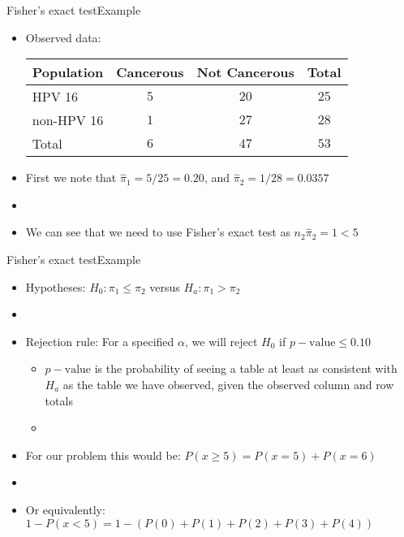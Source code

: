 \documentclass[xcolor=dvipsnames]{beamer}
\begin{document}
\begin{frame}{Fisher's exact test}{Example}
	\begin{itemize}
		\item Observed data:
		\begin{center}
			\begin{tabular}{l|cc|c}
				\hline
				\textbf{Population} & \textbf{Cancerous} & \textbf{Not Cancerous} & \textbf{Total} \\ \hline \hline
				HPV 16 & $5$ &$20$ & $25$\\
				non-HPV 16 & $1$ &$27$ & $28$ \\
				Total & $6$ & $47$ & $53$ \\ \hline
			\end{tabular}
		\end{center} \pause
	\vspace{5mm}
	\item First we note that $\hat{\pi}_1 = 5/25 = 0.20$, and $\hat{\pi}_2 = 1/28 = 0.0357$   \pause
	\item[]
	\item We can see that we need to use Fisher's exact test as $n_2 \hat{\pi}_2 =1 <5$
	\end{itemize}
\end{frame}

\begin{frame}{Fisher's exact test}{Example}
	\begin{itemize}
		\item Hypotheses: $H_0: \pi_1 \leq \pi_2$ versus $H_a: \pi_1 > \pi_2$  \pause
		\item[]
		\item Rejection rule: For a specified $\alpha$, we will reject $H_0$ if $p-\text{value} \leq 0.10$  \pause
		\begin{itemize}
			\item $p-\text{value}$ is the probability of seeing a table at least as consistent with $H_a$ as the table we have observed, given the observed column and row totals  \pause
			\item[]
		\end{itemize}
	\item For our problem this would be: $P(x \geq 5) = P(x = 5)+P(x = 6)$  \pause
	\item[]
	\item Or equivalently:
	$1-P(x < 5) = 1-(P(0) + P(1) + P(2) + P(3) + P(4))$
	\end{itemize}
\end{frame}
\end{document}
